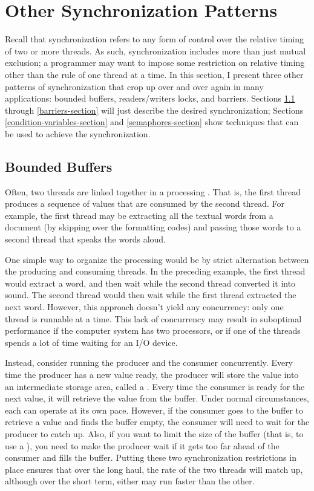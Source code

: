 \section{Other Synchronization Patterns}\label{other-synchronization-problems-section}

Recall that synchronization refers to any form of control over the
relative timing of two or more threads.  As such, synchronization
includes more than just mutual exclusion; a programmer may want to impose some
restriction on relative timing other than the rule of one thread at a
time.  In this section, I present three other patterns of
synchronization that crop up over and over again in many applications:
bounded buffers, readers/writers locks, and barriers.
Sections \ref{bounded-buffers-section} through 
\ref{barriers-section} will just describe the desired synchronization;
Sections \ref{condition-variables-section} and \ref{semaphores-section} show techniques that can be used to achieve the
synchronization.

\subsection{Bounded Buffers}\label{bounded-buffers-section}

Often, two threads are linked together in a processing
.  That is,
the first thread produces a sequence of values that are consumed by
the second thread.  For example, the first thread may be extracting
all the textual words from a document (by skipping over the formatting
codes) and passing those words to a second thread that speaks the
words aloud.

One simple way to organize the processing would be by strict
alternation between the producing and consuming threads.  In the preceding
example, the first thread would extract a word, and then wait while
the second thread converted it into sound.  The second thread would
then wait while the first thread extracted the next word.  However,
this approach doesn't yield any concurrency: only one thread is
runnable at a time.  This lack of concurrency may result in suboptimal
performance if the computer system has two processors, or
if one of the threads spends a lot of time waiting for an I/O device.

Instead, consider running the producer and the consumer
concurrently.  Every time the producer has a new value ready, the producer will
store the value into an intermediate storage area, called a .
Every time the consumer is ready for the next value, it will retrieve
the value from the buffer.  Under normal circumstances, each can operate at
its own pace.  However, if the consumer goes to the buffer to retrieve
a value and finds the buffer empty, the consumer will need to wait for the
producer to catch up.  Also, if you want to limit the size of the
buffer (that is, to use a ), you need to make the producer wait
if it gets too far ahead of the consumer and fills the buffer.  Putting
these two synchronization restrictions in place ensures that over the
long haul, the rate of the two threads will match up, although
over the short term, either may run faster than the other.

